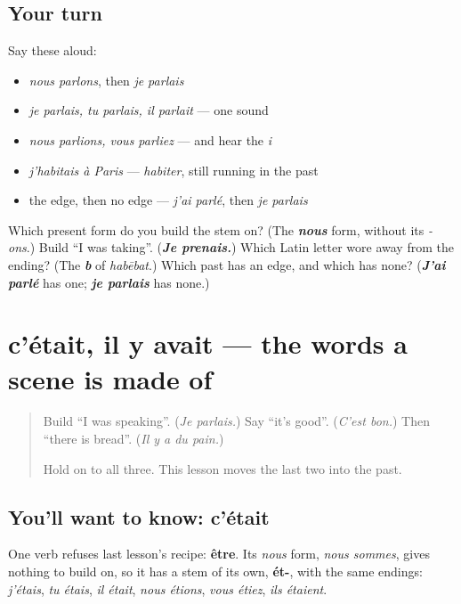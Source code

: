 \subsection*{Your turn}
Say these aloud:

\begin{itemize}
\raggedright
  \item \emph{nous parlons}, then \emph{je parlais}
  \item \emph{je parlais, tu parlais, il parlait} — one sound
  \item \emph{nous parlions, vous parliez} — and hear the \emph{i}
  \item \emph{j'habitais à Paris} — \emph{habiter}, still running in the past
  \item the edge, then no edge — \emph{j'ai parlé}, then \emph{je parlais}
\end{itemize}

\begin{tcolorbox}[breakable,colback=teal!4,colframe=teal!35!black,title={Before you move on}]
Which present form do you build the stem on? (The \emph{\textbf{nous}} form, without its \emph{-ons}.) Build \textquotedblleft{}I was taking\textquotedblright{}. (\emph{\textbf{Je prenais.}}) Which Latin letter wore away from the ending? (The \emph{\textbf{b}} of \emph{habēbat}.) Which past has an edge, and which has none? (\emph{\textbf{J'ai parlé}} has one; \emph{\textbf{je parlais}} has none.)
\end{tcolorbox}
\section[c'était, il y avait]{c'était, il y avait — the words a scene is made of}

\label{lesson:FR-C258-cetait}



\begin{quote}
Build \textquotedblleft{}I was speaking\textquotedblright{}. (\emph{Je parlais.}) Say \textquotedblleft{}it's good\textquotedblright{}. (\emph{C'est bon.}) Then \textquotedblleft{}there is bread\textquotedblright{}. (\emph{Il y a du pain.})

Hold on to all three. This lesson moves the last two into the past.
\end{quote}

\subsection*{You'll want to know: c'était}
One verb refuses last lesson's recipe: \textbf{être}. Its \emph{nous} form, \emph{nous sommes}, gives nothing to build on, so it has a stem of its own, \textbf{ét-}, with the same endings: \emph{j'étais}, \emph{tu étais}, \emph{il était}, \emph{nous étions}, \emph{vous étiez}, \emph{ils étaient}.

